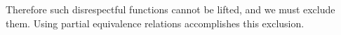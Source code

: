 \documentclass[envcountsame,runningheads]{llncs}
\newcommand{\quotient}{partial equivalence}
\begin{document}
\begin{comment}
Any equivalence relation $E^2$ for the function type
$\tau \rightarrow \tau$
would
have to be reflexive, so we would have $E^2\ f^?\ f^?$.
But this would invalidate
$\forall f_1\;f_2\;x\;y.\; E^2 f_1\:f_2 \wedge E\ x\ y \Rightarrow E (f_1\;x) (f_2\;y)$,
the higher version of which is
$\forall f_1\;f_2\;x\;y.\;f_1 = f_2 \wedge x = y \Rightarrow f_1\;x = f_2\;y$,
which is obviously true.
Just as every element of the higher type should translate to at least one
element at the lower level,
every true statement at the higher level should translate to a true statement at the lower level.
But this principle is violated in this case.
\end{comment}
Therefore such disrespectful functions cannot be lifted, and
we must exclude them.  Using \quotient{} relations
accomplishes this exclusion.
\begin{comment}
The resulting
relation cannot be
a true equivalence,
but it could be described as an equivalence relation on the field of
the relation, the field being the set of elements which
are related to any element.
\end{comment}
\end{document}
